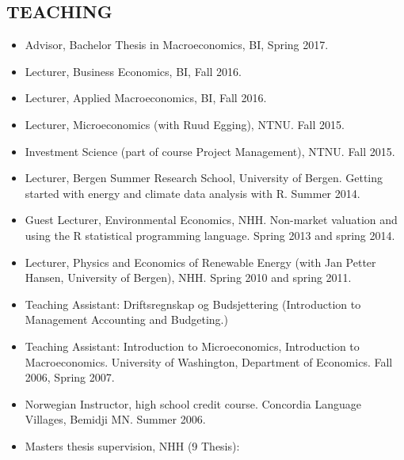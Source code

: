 \documentclass[margin]{res}
\begin{document}
\begin{resume}
\section{TEACHING}
\begin{itemize}
\setlength{\itemsep}{10pt}
\item[] Advisor, Bachelor Thesis in Macroeconomics, BI, Spring 2017.
\item[] Lecturer, Business Economics, BI, Fall 2016.
\item[] Lecturer, Applied Macroeconomics, BI, Fall 2016.
\item[] Lecturer, Microeconomics (with Ruud Egging), NTNU.  Fall 2015.
\item[] Investment Science (part of course Project Management), NTNU.  Fall 2015.
\item[] Lecturer, Bergen Summer Research School, University of Bergen.  Getting started with energy and climate data analysis with R.  Summer 2014.
\item[] Guest Lecturer, Environmental Economics, NHH.  Non-market valuation and using the R statistical programming language.  Spring 2013 and spring 2014.
\item[] Lecturer, Physics and Economics of Renewable Energy (with Jan Petter Hansen, University of Bergen), NHH.  Spring 2010 and spring 2011.
\item[] Teaching Assistant: Driftsregnskap og Budsjettering (Introduction to Management Accounting and Budgeting.)
\item[] Teaching Assistant: Introduction to Microeconomics, Introduction to Macroeconomics.  University of Washington, Department of Economics. Fall 2006, Spring 2007.
\item[] Norwegian Instructor, high school credit course.  Concordia Language Villages, Bemidji MN.  Summer 2006.
\item [] Masters thesis supervision, NHH (9 Thesis):

\end{itemize}
\end{resume}
\end{document}
